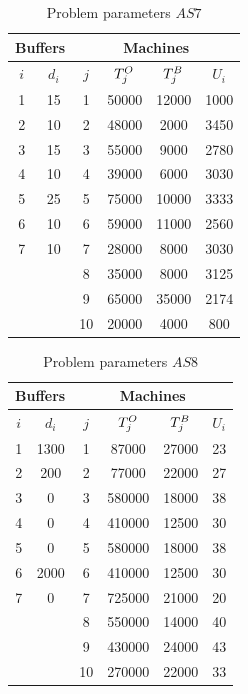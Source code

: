 \documentclass{ifacconf}
\begin{document}
\begin{table}[h!]
	\centering
	\small
	\begin{tabular}{||c|c||c|c|c|c||}
		\hline 
		\multicolumn{2}{||c||}{Buffers}&\multicolumn{4}{|c||}{Machines}\\
		\hline
		$i$ & $d_i$ & $j$  & $T^{\rm O}_j$ & $T^{\rm B}_j$ & $U_i$ \\
		\hline
		1 & 15 & 1 & 50000 & 12000 & 1000\\
		2 & 10 & 2 & 48000 & 2000 & 3450\\
		3 & 15 & 3 & 55000 & 9000 & 2780 \\
		4 & 10 & 4 & 39000 & 6000 & 3030\\
		5 &  25  & 5 & 75000 & 10000 & 3333\\
		6 &  10 & 6 & 59000 & 11000 & 2560\\
		7 & 10 & 7 & 28000 & 8000 & 3030\\
			&  & 8 & 35000 & 8000 & 3125\\
			&  & 9 & 65000 &  35000 & 2174\\
			&  & 10 & 20000 & 4000 & 800\\
		\hline
	\end{tabular}
	\caption{Problem parameters $\textit{AS7}$} \label{tabl:as7}
\end{table}
\begin{table}[h!]
	\centering
	\small
	\begin{tabular}{||c|c||c|c|c|c||}
		\hline
		\multicolumn{2}{||c||}{Buffers}&\multicolumn{4}{|c||}{Machines}\\
		\hline
		$i$ & $d_i$ & $j$  & $T^{\rm O}_j$ & $T^{\rm B}_j$ & $U_i$ \\
		\hline
		1 & 1300 & 1 & 87000 & 27000 & 23\\
		2 & 200 & 2 & 77000 & 22000 & 27\\
		3 & 0 & 3 & 580000 & 18000 & 38\\
		4 & 0 & 4 & 410000 & 12500 & 30\\
		5 & 0 & 5 & 580000 & 18000 & 38\\
		6 & 2000 & 6 & 410000 & 12500 & 30\\
		7 & 0 & 7 & 725000 & 21000 & 20\\
		  &  & 8 & 550000 & 14000 & 40\\
		 &  & 9 & 430000 & 24000 & 43\\
		   &  & 10 & 270000 & 22000 & 33\\
		\hline
	\end{tabular}
	\caption{Problem parameters $\textit{AS8}$} \label{tabl:as8}
\end{table}
\end{document}
